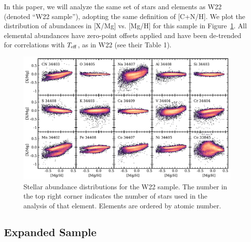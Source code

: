 \documentclass[modern]{aastex631}
\newcommand{\teff}{T_{\rm eff}}
\begin{document}
In this paper, we will analyze the same set of stars and elements as W22 (denoted ``W22 sample''), adopting the same definition of [C+N/H]. We plot the distribution of abundances in [X/Mg] vs. [Mg/H] for this sample in Figure~\ref{fig:w22_xmg}. All elemental abundances have zero-point offsets applied and have been de-trended for correlations with $\teff$, as in W22 (see their Table 1). 

\begin{figure}[htb!]
    \centering
    \includegraphics[width=\textwidth]{Figures/W22_xmg.pdf}
    \caption{Stellar abundance distributions for the W22 sample. The number in the top right corner indicates the number of stars used in the analysis of that element. Elements are ordered by atomic number.}
    \label{fig:w22_xmg}
\end{figure}

\subsection{Expanded Sample}
\end{document}
